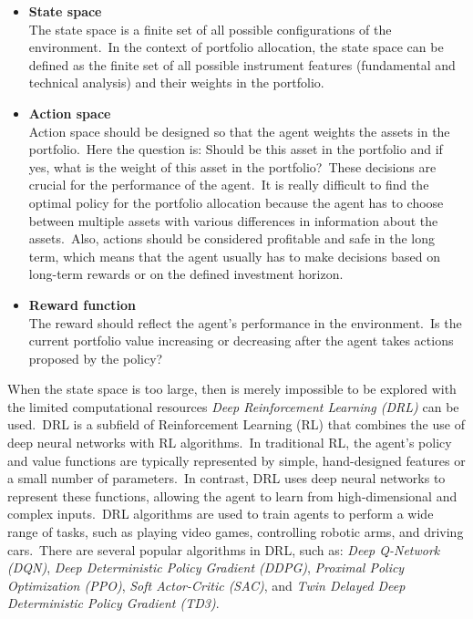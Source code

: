 \documentclass[../xlapes02]{subfiles}
\begin{document}
    \begin{itemize}
        \item \textbf{State space}\\ The state space is a finite set of all possible configurations of the environment.\ In the context of portfolio allocation, the state space can be defined as the finite set of all possible instrument features (fundamental and technical analysis) and their weights in the portfolio.
        \item \textbf{Action space} \\ Action space should be designed so that the agent weights the assets in the portfolio.\ Here the question is: Should be this asset in the portfolio and if yes, what is the weight of this asset in the portfolio?\ These decisions are crucial for the performance of the agent.\ It is really difficult to find the optimal policy for the portfolio allocation because the agent has to choose between multiple assets with various differences in information about the assets.\ Also, actions should be considered profitable and safe in the long term, which means that the agent usually has to make decisions based on long-term rewards or on the defined investment horizon.
        \item \textbf{Reward function}\\ The reward should reflect the agent's performance in the environment.\ Is the current portfolio value increasing or decreasing after the agent takes actions proposed by the policy?
    \end{itemize}

    When the state space is too large, then is merely impossible to be explored with the limited computational resources \emph{Deep Reinforcement Learning (DRL)} can be used.\ DRL is a subfield of Reinforcement Learning (RL) that combines the use of deep neural networks with RL algorithms.\ In traditional RL, the agent's policy and value functions are typically represented by simple, hand-designed features or a small number of parameters.\ In contrast, DRL uses deep neural networks to represent these functions, allowing the agent to learn from high-dimensional and complex inputs.\ DRL algorithms are used to train agents to perform a wide range of tasks, such as playing video games, controlling robotic arms, and driving cars.\ There are several popular algorithms in DRL, such as: \emph{Deep Q-Network (DQN)}, \emph{Deep Deterministic Policy Gradient (DDPG)}, \emph{Proximal Policy Optimization (PPO)}, \emph{Soft Actor-Critic (SAC)}, and \emph{Twin Delayed Deep Deterministic Policy Gradient (TD3)}.
\end{document}
